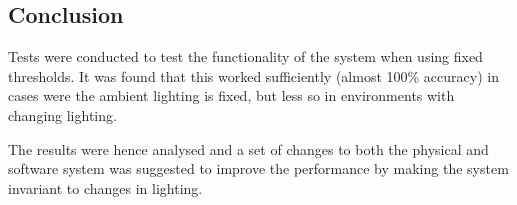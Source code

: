 \subsection{Conclusion}
Tests were conducted to test the functionality of the system when using fixed thresholds.
It was found that this worked sufficiently (almost 100\% accuracy) in cases were the ambient lighting is fixed, but less so in environments with changing lighting.

The results were hence analysed and a set of changes to both the physical and software system was suggested to improve the performance by making the system invariant to changes in lighting.






